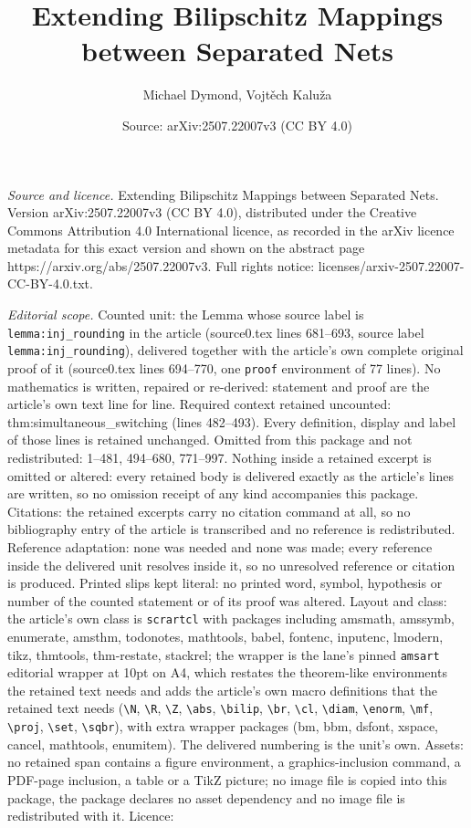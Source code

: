 \documentclass[10pt,a4paper]{amsart}
\title[Extending Bilipschitz Mappings between Separated Nets]{Extending Bilipschitz Mappings between Separated Nets}
\author{Michael Dymond, Vojt\v{e}ch Kalu\v{z}a}
\date{Source: arXiv:2507.22007v3 (CC BY 4.0)}
\begin{document}
\maketitle

\noindent\emph{Source and licence.} Extending Bilipschitz Mappings between Separated Nets. Version arXiv:2507.22007v3 (CC BY 4.0), distributed under the Creative Commons Attribution 4.0 International licence, as recorded in the arXiv licence metadata for this exact version and shown on the abstract page https://arxiv.org/abs/2507.22007v3. Full rights notice: licenses/arxiv-2507.22007-CC-BY-4.0.txt.\par\smallskip

\noindent\textit{Editorial scope.} Counted unit: the Lemma whose source label is \texttt{lemma:inj\_rounding} in the article (source0.tex lines 681--693, source label \texttt{lemma:inj\_rounding}), delivered together with the article's own complete original proof of it (source0.tex lines 694--770, one \texttt{proof} environment of 77 lines). No mathematics is written, repaired or re-derived: statement and proof are the article's own text line for line. Required context retained uncounted: thm:simultaneous\_switching (lines 482--493). Every definition, display and label of those lines is retained unchanged. Omitted from this package and not redistributed: 1--481, 494--680, 771--997. Nothing inside a retained excerpt is omitted or altered: every retained body is delivered exactly as the article's lines are written, so no omission receipt of any kind accompanies this package. Citations: the retained excerpts carry no citation command at all, so no bibliography entry of the article is transcribed and no reference is redistributed. Reference adaptation: none was needed and none was made; every reference inside the delivered unit resolves inside it, so no unresolved reference or citation is produced. Printed slips kept literal: no printed word, symbol, hypothesis or number of the counted statement or of its proof was altered. Layout and class: the article's own class is \texttt{scrartcl} with packages including amsmath, amssymb, enumerate, amsthm, todonotes, mathtools, babel, fontenc, inputenc, lmodern, tikz, thmtools, thm-restate, stackrel; the wrapper is the lane's pinned \texttt{amsart} editorial wrapper at 10pt on A4, which restates the theorem-like environments the retained text needs and adds the article's own macro definitions that the retained text needs (\texttt{\textbackslash N}, \texttt{\textbackslash R}, \texttt{\textbackslash Z}, \texttt{\textbackslash abs}, \texttt{\textbackslash bilip}, \texttt{\textbackslash br}, \texttt{\textbackslash cl}, \texttt{\textbackslash diam}, \texttt{\textbackslash enorm}, \texttt{\textbackslash mf}, \texttt{\textbackslash proj}, \texttt{\textbackslash set}, \texttt{\textbackslash sqbr}), with extra wrapper packages (bm, bbm, dsfont, xspace, cancel, mathtools, enumitem). The delivered numbering is the unit's own. Assets: no retained span contains a figure environment, a graphics-inclusion command, a PDF-page inclusion, a table or a TikZ picture; no image file is copied into this package, the package declares no asset dependency and no image file is redistributed with it. Licence: 
\end{document}
